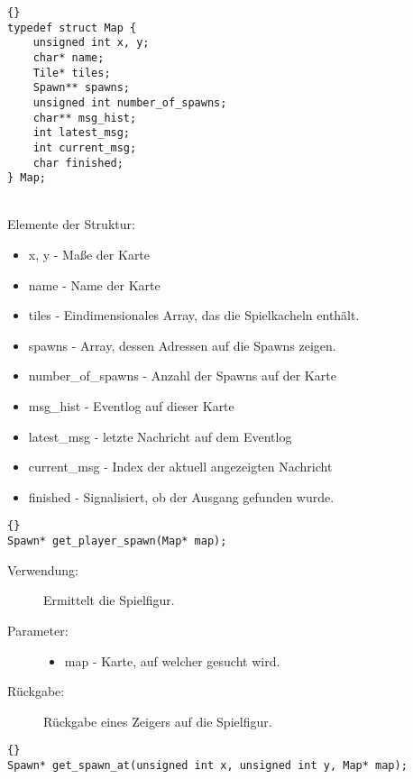 \documentclass[11pt,a4paper,notitlepage]{report}
\begin{document}
			\begin{lstlisting}[caption=Map]{}
typedef struct Map {
	unsigned int x, y;
	char* name;
	Tile* tiles;
	Spawn** spawns;
	unsigned int number_of_spawns;
	char** msg_hist;
	int latest_msg;
	int current_msg;
	char finished;
} Map;
		\end{lstlisting} \hspace*{\fill} \\
Elemente der Struktur:
		\begin{itemize}
			\item x, y - Maße der Karte
			\item name - Name der Karte
			\item tiles - Eindimensionales Array, das die Spielkacheln enthält.
			\item spawns - Array, dessen Adressen auf die Spawns zeigen.
			\item number\_of\_spawns - Anzahl der Spawns auf der Karte
			\item msg\_hist - Eventlog auf dieser Karte
			\item latest\_msg - letzte Nachricht auf dem Eventlog
			\item current\_msg - Index der aktuell angezeigten Nachricht
			\item finished - Signalisiert, ob der Ausgang gefunden wurde.
		\end{itemize}
		
		\begin{lstlisting}[caption=get\_player\_spawn]{}
Spawn* get_player_spawn(Map* map);
		\end{lstlisting}
		
	\begin{description}
		\item[Verwendung:] Ermittelt die Spielfigur.
		\item[Parameter:] \hfill
		\begin{itemize}
			\item map - Karte, auf welcher gesucht wird.
		\end{itemize}
		\item[Rückgabe:] Rückgabe eines Zeigers auf die Spielfigur.
	\end{description}
	
		\begin{lstlisting}[caption=get\_spawn\_at]{}
Spawn* get_spawn_at(unsigned int x, unsigned int y, Map* map);
		\end{lstlisting}
		
\end{document}
